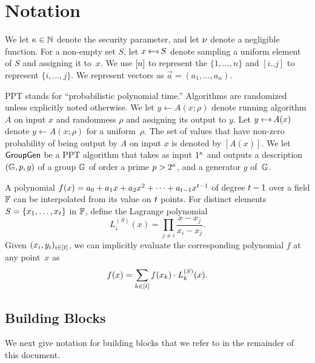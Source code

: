 \section{Notation}

We let $\kappa \in \mathbb{N}$ denote the security parameter, and let
$\nu$ denote a negligible function.
For a non-empty set $S$, let $x\randpick S$ denote sampling
a uniform element of $S$ and assigning it to~$x$.
We use $[n]$ to represent the $\{1,\ldots,n \}$ and $[i..j]$ to represent $\{i,\ldots,j \}$.
We represent vectors as $\vec{a} = ( a_1, \ldots, a_n )$.

PPT stands for ``probabilistic polynomial time.''  Algorithms are randomized unless explicitly noted otherwise.
We let $y \gets A(x;\rho)$ denote running algorithm $A$ on
input $x$ and randomness $\rho$ and assigning its output to $y$.
Let $y \randpick A(x)$
denote $y \gets A(x;\rho)$ for a uniform~$\rho$.
The set of values that have non-zero probability of being output by $A$ on input $x$ is denoted by $[A(x)]$.
We let $\mathsf{GroupGen}$ be a PPT algorithm that takes as input $1^{\kappa}$ and outputs a description $(\mathbb{G}, p, g)$ of a group $\mathbb{G}$ of order a prime $p>2^\kappa$, and a generator $g$ of~$\mathbb{G}$.

\medskip{}
A polynomial $f(x) = a_0 + a_1 x + a_2 x^2 + \cdots + a_{t-1} x^{t-1}$
of degree $t-1$ over a field $\mathbb{F}$ can be interpolated from its value on $t$ points.
For  distinct elements~$S = \{x_1, \ldots, x_{t}\}$ in $\mathbb{F}$,
define the Lagrange polynomial
\begin{equation}\label{eqn:lagrange}
L_i^{(S)}(x) = \prod_{j \neq i } \frac{x-x_j}{x_i - x_j}.
\end{equation}
Given $(x_i, y_i)_{i \in [t]}$, we can implicitly evaluate the corresponding polynomial $f$ at any point~$x$ as
\[ f(x) = \sum_{k \in [t]} f(x_k) \cdot L^{(S)}_k(x). \]


\subsection{Building Blocks}

We next give notation for building blocks that we refer to in the remainder of
this document.

